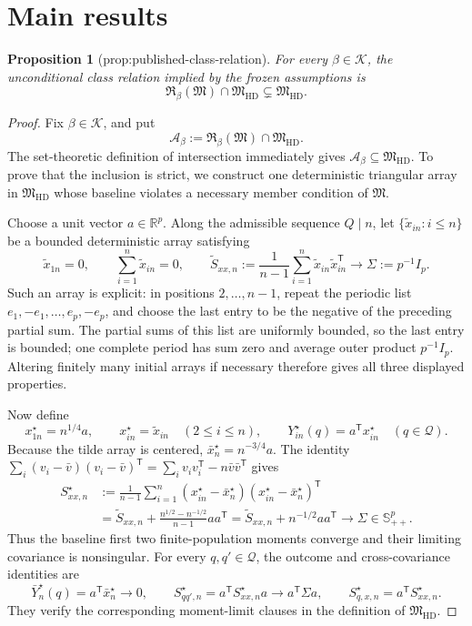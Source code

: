 \documentclass{article}
\newtheorem{proposition}{Proposition}
\begin{document}
\section{Main results}

\begin{proposition}[prop:published-class-relation]\label{prop:published-class-relation}
For every \(\beta\in\mathcal K\), the unconditional class relation implied by the frozen assumptions is
\[
\mathfrak R_{\beta}(\mathfrak M)\cap\mathfrak M_{\mathrm{HD}}
\subsetneq \mathfrak M_{\mathrm{HD}}.
\]
\end{proposition}
\begin{proof}
Fix \(\beta\in\mathcal K\), and put
\[
\mathcal A_\beta
 :=\mathfrak R_\beta(\mathfrak M)\cap\mathfrak M_{\mathrm{HD}}.
\]
The set-theoretic definition of intersection immediately gives
\(\mathcal A_\beta\subseteq\mathfrak M_{\mathrm{HD}}\).  To prove that the
inclusion is strict, we construct one deterministic triangular array in
\(\mathfrak M_{\mathrm{HD}}\) whose baseline violates a necessary member
condition of \(\mathfrak M\).

Choose a unit vector \(a\in\mathbb R^p\).  Along the admissible sequence
\(Q\mid n\), let \(\{\widetilde x_{in}:i\le n\}\) be a bounded deterministic
array satisfying
\[
\widetilde x_{1n}=0,
\qquad
\sum_{i=1}^n\widetilde x_{in}=0,
\qquad
\widetilde S_{xx,n}
 :=\frac1{n-1}\sum_{i=1}^n
       \widetilde x_{in}\widetilde x_{in}^{\mathsf T}
 \longrightarrow \Sigma:=p^{-1}I_p.
\]
Such an array is explicit: in positions \(2,\ldots,n-1\), repeat the
periodic list \(e_1,-e_1,\ldots,e_p,-e_p\), and choose the last entry to be
the negative of the preceding partial sum.  The partial sums of this list
are uniformly bounded, so the last entry is bounded; one complete period
has sum zero and average outer product \(p^{-1}I_p\).  Altering finitely many
initial arrays if necessary therefore gives all three displayed properties.

Now define
\[
x_{1n}^{\star}=n^{1/4}a,
\qquad
x_{in}^{\star}=\widetilde x_{in}\quad(2\le i\le n),
\qquad
Y_{in}^{\star}(q)=a^{\mathsf T}x_{in}^{\star}
\quad(q\in\mathcal Q).
\]
Because the tilde array is centered,
\(\bar x_n^{\star}=n^{-3/4}a\).  The identity
\(\sum_i(v_i-\bar v)(v_i-\bar v)^{\mathsf T}
=\sum_i v_iv_i^{\mathsf T}-n\bar v\bar v^{\mathsf T}\) gives
\[
\begin{aligned}
S_{xx,n}^{\star}
&:=\frac1{n-1}\sum_{i=1}^n
 (x_{in}^{\star}-\bar x_n^{\star})
 (x_{in}^{\star}-\bar x_n^{\star})^{\mathsf T}\\
&=\widetilde S_{xx,n}
  +\frac{n^{1/2}-n^{-1/2}}{n-1}aa^{\mathsf T}
 =\widetilde S_{xx,n}+n^{-1/2}aa^{\mathsf T}
 \longrightarrow \Sigma\in\mathbb S_{++}^p.
\end{aligned}
\]
Thus the baseline first two finite-population moments converge and their
limiting covariance is nonsingular.  For every \(q,q'\in\mathcal Q\), the
outcome and cross-covariance identities are
\[
\bar Y_n^{\star}(q)=a^{\mathsf T}\bar x_n^{\star}\longrightarrow0,
\qquad
S_{qq',n}^{\star}=a^{\mathsf T}S_{xx,n}^{\star}a
 \longrightarrow a^{\mathsf T}\Sigma a,
\qquad
S_{q,x,n}^{\star}=a^{\mathsf T}S_{xx,n}^{\star}.
\]
They verify the corresponding moment-limit clauses in the definition of
\(\mathfrak M_{\mathrm{HD}}\).


\end{proof}
\end{document}
